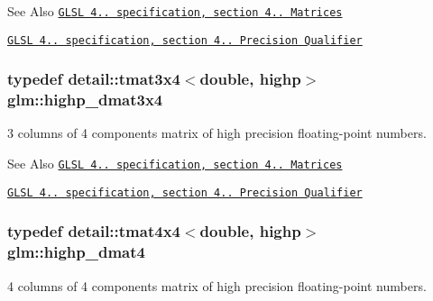 \begin{DoxySeeAlso}{See Also}
\href{http://www.opengl.org/registry/doc/GLSLangSpec.4.20.8.pdf}{\tt G\-L\-S\-L 4.. specification, section 4.. Matrices} 

\href{http://www.opengl.org/registry/doc/GLSLangSpec.4.20.8.pdf}{\tt G\-L\-S\-L 4.. specification, section 4.. Precision Qualifier} 
\end{DoxySeeAlso}
\hypertarget{group__core__precision_gaff199c8d04a8edb92ed43283e8694c59}{
\subsubsection[{highp\-\_\-dmat3x4}]{\setlength{\rightskip}{0pt plus 5cm}typedef detail\-::tmat3x4$<$double, highp$>$ {\bf glm\-::highp\-\_\-dmat3x4}}}\label{group__core__precision_gaff199c8d04a8edb92ed43283e8694c59}
3 columns of 4 components matrix of high precision floating-\/point numbers.

\begin{DoxySeeAlso}{See Also}
\href{http://www.opengl.org/registry/doc/GLSLangSpec.4.20.8.pdf}{\tt G\-L\-S\-L 4.. specification, section 4.. Matrices} 

\href{http://www.opengl.org/registry/doc/GLSLangSpec.4.20.8.pdf}{\tt G\-L\-S\-L 4.. specification, section 4.. Precision Qualifier} 
\end{DoxySeeAlso}
\hypertarget{group__core__precision_ga9a5d95e476d451d28d3939ac7f124baf}{
\subsubsection[{highp\-\_\-dmat4}]{\setlength{\rightskip}{0pt plus 5cm}typedef detail\-::tmat4x4$<$double, highp$>$ {\bf glm\-::highp\-\_\-dmat4}}}\label{group__core__precision_ga9a5d95e476d451d28d3939ac7f124baf}
4 columns of 4 components matrix of high precision floating-\/point numbers.


